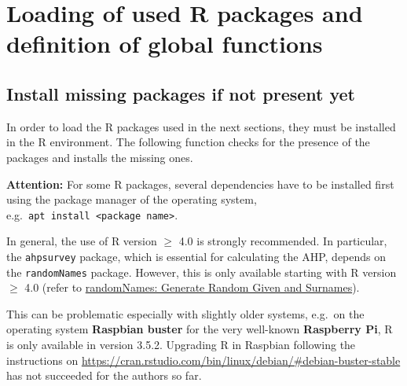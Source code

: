\documentclass [oneside,10pt,a4paper,ngerman,BCOR10mm,headsepline,parindent,final]{scrartcl}
\begin{document}
    \hypertarget{loading-of-used-r-packages-and-definition-of-global-functions}{%
\section{Loading of used R packages and definition of global
functions}\label{loading-of-used-r-packages-and-definition-of-global-functions}}

\hypertarget{install-missing-packages-if-not-present-yet}{%
\subsection{Install missing packages if not present
yet}\label{install-missing-packages-if-not-present-yet}}

In order to load the R packages used in the next sections, they must be
installed in the R environment. The following function checks for the
presence of the packages and installs the missing ones.

\textbf{Attention:} For some R packages, several dependencies have to be
installed first using the package manager of the operating system,
e.g.~\texttt{apt\ install\ \textless{}package\ name\textgreater{}}.

In general, the use of R version \(\geq\) 4.0 is strongly recommended.
In particular, the \texttt{ahpsurvey} package, which is essential for
calculating the AHP, depends on the \texttt{randomNames} package.
However, this is only available starting with R version \(\geq\) 4.0
(refer to
\href{https://cran.r-project.org/web/packages/randomNames/index.html}{randomNames:
Generate Random Given and Surnames}).

This can be problematic especially with slightly older systems, e.g.~on
the operating system \textbf{Raspbian buster} for the very well-known
\textbf{Raspberry Pi}, R is only available in version 3.5.2. Upgrading R
in Raspbian following the instructions on
\url{https://cran.rstudio.com/bin/linux/debian/\#debian-buster-stable}
has not succeeded for the authors so far.
\end{document}
